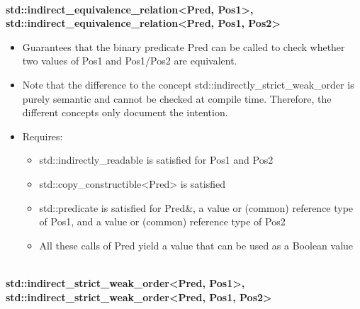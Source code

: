 \noindent
\hspace*{\fill} \\ %
\textbf{std::indirect\_equivalence\_relation<Pred, Pos1>, std::indirect\_equivalence\_relation<Pred, Pos1, Pos2>}

\begin{itemize}
\item
Guarantees that the binary predicate Pred can be called to check whether two values of Pos1 and Pos1/Pos2 are equivalent.

\item
Note that the difference to the concept std::indirectly\_strict\_weak\_order is purely semantic and cannot be checked at compile time. Therefore, the different concepts only document the intention.

\item
Requires:
\begin{itemize}
\item
std::indirectly\_readable is satisfied for Pos1 and Pos2

\item
std::copy\_constructible<Pred> is satisfied

\item
std::predicate is satisfied for Pred\&, a value or (common) reference type of Pos1, and a value or (common) reference type of Pos2

\item
All these calls of Pred yield a value that can be used as a Boolean value
\end{itemize}
\end{itemize}


\noindent
\hspace*{\fill} \\ %
\textbf{std::indirect\_strict\_weak\_order<Pred, Pos1>, std::indirect\_strict\_weak\_order<Pred, Pos1, Pos2>}

